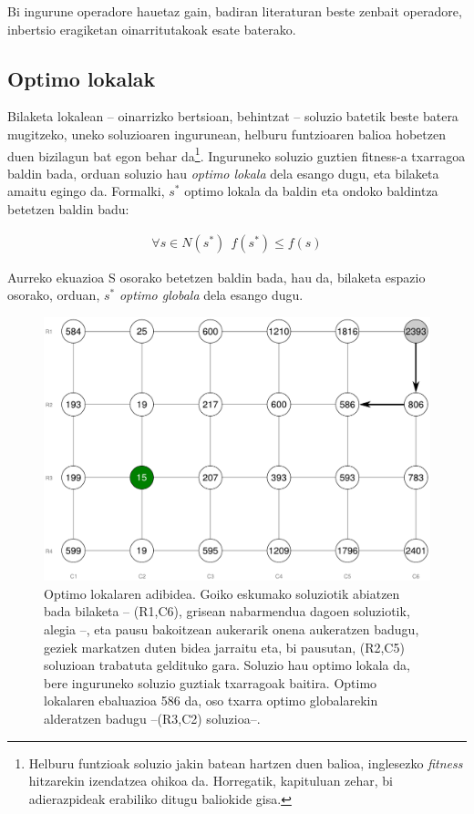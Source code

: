 \documentclass[eu]{ifirak}\usepackage[]{graphicx}\usepackage[]{color}
\begin{document}
Bi ingurune operadore hauetaz gain, badiran literaturan beste zenbait operadore, inbertsio eragiketan oinarritutakoak esate baterako.


\subsection{Optimo lokalak}

Bilaketa lokalean -- oinarrizko bertsioan, behintzat -- soluzio batetik beste batera mugitzeko, uneko soluzioaren ingurunean, helburu funtzioaren balioa hobetzen duen bizilagun bat egon behar da\footnote{Helburu funtzioak soluzio jakin batean hartzen duen balioa, inglesezko {\it fitness} hitzarekin izendatzea ohikoa da. Horregatik, kapituluan zehar, bi adierazpideak erabiliko ditugu baliokide gisa.}. Inguruneko soluzio guztien fitness-a txarragoa baldin bada, orduan soluzio hau \textit{optimo lokala} dela esango dugu, eta bilaketa amaitu egingo da. Formalki, $s^*$ optimo lokala da baldin eta ondoko baldintza betetzen baldin badu:

\begin{align*}
\forall s \in N(s^*)\ \ f(s^*)\leq f(s)
\end{align*}

Aurreko ekuazioa {\cal S} osorako betetzen baldin bada, hau da, bilaketa espazio osorako, orduan, $s^*$ \textit{optimo globala} dela esango dugu.

\begin{figure}[t]
\centering
\includegraphics[width=0.66\linewidth]{./Irudiak/local_optimum}
\caption{Optimo lokalaren adibidea. Goiko eskumako soluziotik abiatzen bada bilaketa -- (R1,C6), grisean nabarmendua dagoen soluziotik, alegia --, eta pausu bakoitzean aukerarik onena aukeratzen badugu, geziek markatzen duten bidea jarraitu eta, bi pausutan, (R2,C5) soluzioan trabatuta geldituko gara. Soluzio hau optimo lokala da, bere inguruneko soluzio guztiak txarragoak baitira. Optimo lokalaren ebaluazioa 586 da, oso txarra optimo globalarekin alderatzen badugu --(R3,C2) soluzioa--.}
\label{fig:local_optimum}
\end{figure}
\end{document}
